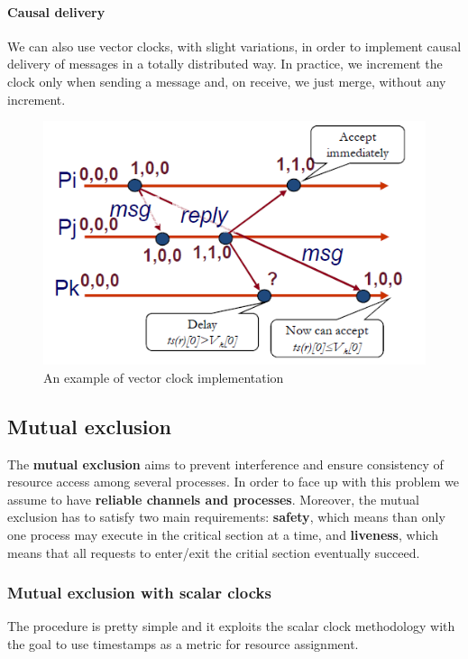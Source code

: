 \paragraph{Causal delivery}
We can also use vector clocks, with slight variations, in order to implement causal delivery of messages in a totally distributed way. In practice, we increment the clock only when sending a message and, on receive, we just merge, without any increment.

\begin{figure}[h]
    \caption{An example of vector clock implementation}
    \includegraphics[scale=0.5]{src/images/synchronization/vector-clock-causality.png}
    \centering
\end{figure}

\subsection{Mutual exclusion}
The \textbf{mutual exclusion} aims to prevent interference and ensure consistency of resource access among several processes. In order to face up with this problem we assume to have \textbf{reliable channels and processes}. Moreover, the mutual exclusion has to satisfy two main requirements: \textbf{safety}, which means than only one process may execute in the critical section at a time, and \textbf{liveness}, which means that all requests to enter/exit the critial section eventually succeed.

\subsubsection{Mutual exclusion with scalar clocks}
The procedure is pretty simple and it exploits the scalar clock methodology with the goal to use timestamps as a metric for resource assignment.

